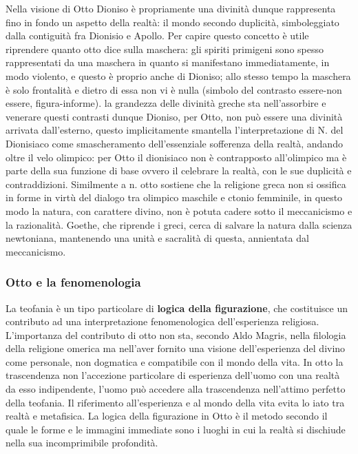 \documentclass[10pt,a4paper]{article}
\begin{document}
Nella visione di Otto Dioniso è propriamente una divinità dunque rappresenta fino in fondo un aspetto della realtà: il mondo secondo duplicità, simboleggiato dalla contiguità fra Dionisio e Apollo. Per capire questo concetto è utile riprendere quanto otto dice sulla maschera: gli spiriti primigeni sono spesso rappresentati da una maschera in quanto si manifestano immediatamente, in modo violento, e questo è proprio anche di Dioniso; allo stesso tempo la maschera è solo frontalità e dietro di essa non vi è nulla (simbolo del contrasto essere-non essere, figura-informe). la grandezza delle divinità greche sta nell'assorbire e venerare questi contrasti dunque Dioniso, per Otto, non può essere una divinità arrivata dall'esterno, questo implicitamente smantella l'interpretazione di N. del Dionisiaco come smascheramento dell'essenziale sofferenza della realtà, andando oltre il velo olimpico: per Otto il dionisiaco non è contrapposto all'olimpico ma è parte della sua funzione di base ovvero il celebrare la realtà, con le sue duplicità e contraddizioni. Similmente a n. otto sostiene che la religione greca non si ossifica in forme in virtù del dialogo tra olimpico maschile e ctonio femminile, in questo modo la natura, con carattere divino, non è potuta cadere sotto il meccanicismo e la razionalità. Goethe, che riprende i greci, cerca di salvare la natura dalla scienza newtoniana, mantenendo una unità e sacralità di questa, annientata dal meccanicismo. 
\subsubsection{Otto e la fenomenologia}
La teofania è un tipo particolare di \textbf{logica della figurazione}, che costituisce un contributo ad una interpretazione fenomenologica dell'esperienza religiosa. L'importanza del contributo di otto non sta, secondo Aldo Magris, nella filologia della religione omerica ma nell'aver fornito una visione dell'esperienza del divino come personale, non dogmatica e compatibile con il mondo della vita. In otto la trascendenza non l'accezione particolare di esperienza dell'uomo con una realtà da esso indipendente, l'uomo può accedere alla trascendenza nell'attimo perfetto della teofania. Il riferimento all'esperienza e al mondo della vita evita lo iato tra realtà e metafisica. La logica della figurazione in Otto è il metodo secondo il quale le forme e le immagini immediate sono i luoghi in cui la realtà si dischiude nella sua incomprimibile profondità.
\end{document}
